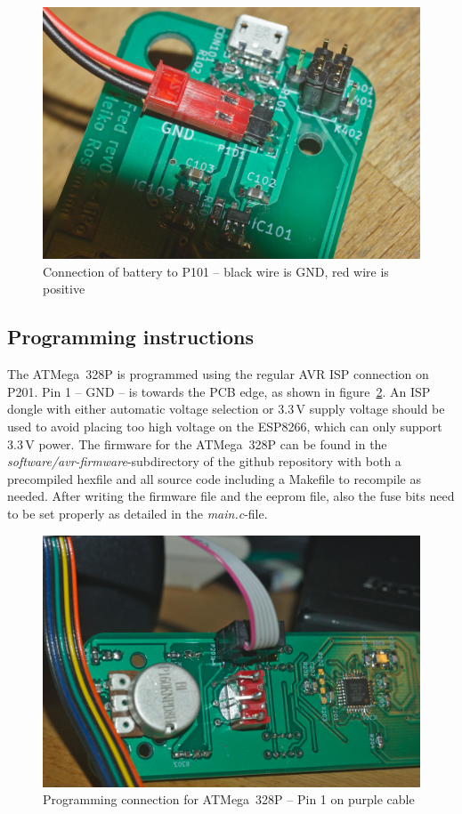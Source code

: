\documentclass[11pt,a4paper]{scrartcl}
\begin{document}
\begin{figure}[tbhp]
  \centering
  \includegraphics[width=0.8 \textwidth]{images/_DSC0148}
  \caption{Connection of battery to P101 -- black wire is GND, red wire is positive}
  \label{battConnection}
\end{figure}

\subsection{Programming instructions}

The ATMega~328P is programmed using the regular AVR ISP connection on P201. Pin 1 -- GND -- is towards the PCB edge, as shown in figure~\ref{progAVR}. An ISP dongle with either automatic voltage selection or 3.3\,V supply voltage should be used to avoid placing too high voltage on the ESP8266, which can only support 3.3\,V power. The firmware for the ATMega~328P can be found in the \textit{software/avr-firmware}-subdirectory of the github repository with both a precompiled hexfile and all source code including a Makefile to recompile as needed. After writing the firmware file and the eeprom file, also the fuse bits need to be set properly as detailed in the \textit{main.c}-file.

\begin{figure}[tbhp]
  \centering
  \includegraphics[width=0.8 \textwidth]{images/_DSC0146}
  \caption{Programming connection for ATMega~328P -- Pin 1 on purple cable}
  \label{progAVR}
\end{figure}
\end{document}
